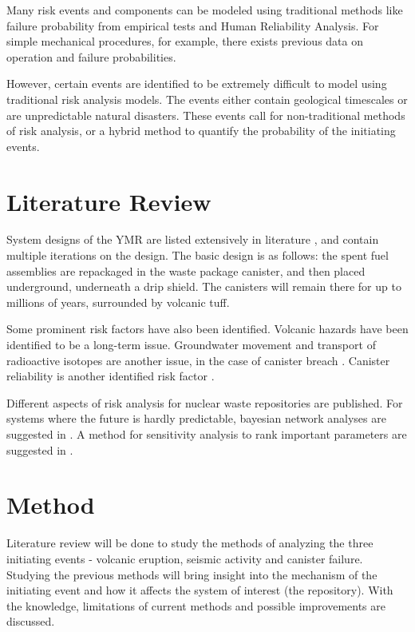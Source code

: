 \documentclass[12pt]{article}
\begin{document}
Many risk events and components can be modeled using traditional methods like
failure probability from empirical tests and Human Reliability Analysis.
For simple mechanical procedures, for example, there exists previous data
on operation and failure probabilities. 

However, certain events are identified to be extremely difficult
to model using traditional risk analysis models. The events either
contain geological timescales or are unpredictable natural disasters.
These events call for non-traditional methods of risk analysis, or a hybrid
method to quantify the probability of the initiating events.


\section{Literature Review}
System designs of the \gls{YMR} are listed extensively in literature \cite{u.s._department_of_energy_office_of_civilian_radioactive_waste_management_national_2008, wilson_total-system_1994, rechard_evolution_2014, u.s._department_of_energy_yucca_2002}, and contain multiple
iterations on the design. The basic design is as follows: the spent fuel assemblies
are repackaged in the waste package canister, and then placed underground,
underneath a drip shield. The canisters will remain there for up to millions of years,
surrounded by volcanic tuff.

Some prominent risk factors have also been identified. Volcanic hazards \cite{ho_risk_1992, smith_area_1990}
have been identified to be a long-term issue. Groundwater movement and transport of 
radioactive isotopes are another issue, in the case of canister breach \cite{robison_ground-water_1984, quade_fossil_1995}.  Canister reliability is another
identified risk factor \cite{whipple_can_1996, rutqvist_analysis_2003}.

Different aspects of risk analysis for nuclear waste repositories are published.
For systems where the future is hardly predictable, bayesian network analyses are 
suggested in \cite{lee_application_2006}. A method for sensitivity analysis
to rank important parameters are suggested in \cite{mohanty_cdf_2001}.


\section{Method}

Literature review will be done to study the methods of analyzing the three
initiating events - volcanic eruption, seismic activity and canister
failure. Studying the previous methods will bring insight into 
the mechanism of the initiating event and how it affects the system of
interest (the repository). With the knowledge, limitations of
current methods and possible improvements are discussed.
\end{document}
